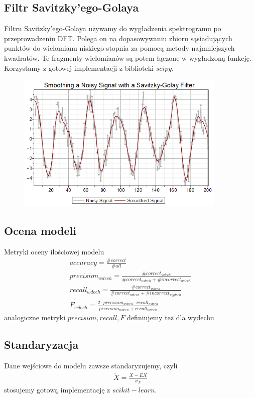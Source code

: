 \documentclass[polish]{article}
\begin{document}
\subsection{Filtr Savitzky'ego-Golaya}
Filtru Savitzky'ego-Golaya używamy do wygładzenia spektrogramu po przeprowadzeniu DFT.  Polega on na dopasowywaniu zbioru sąsiadujących punktów do wielomianu niskiego stopnia za pomocą metody najmniejszych kwadratów.
Te fragmenty wielomianów są potem łączone w wygładzoną funkcję. Korzystamy z gotowej implementacji
z biblioteki $scipy$.
\begin{figure}[H]
	\centering
	\includegraphics[width=10cm]{savitzky_golay_filter}
\end{figure}

\subsection{Ocena modeli}
Metryki oceny ilościowej modelu
\begin{gather*}
	accuracy = \frac{\# correct}{\# all} \\
	precision_{wdech} = \frac{\# correct_{wdech}}{\# correct_{wdech} + \# incorrect_{wdech}} \\
	recall_{wdech} = \frac{\# correct_{wdech}}{\# correct_{wdech} + \# incorrect_{wydech}} \\
	F_{wdech} = \frac{2 \cdot precision_{wdech} \cdot recall_{wdech}}{precision_{wdech} + recall_{wdech}}
\end{gather*}
analogiczne metryki $precision, recall, F$ definiujemy też dla wydechu
\subsection{Standaryzacja}
Dane wejściowe do modelu zawsze standaryzujemy, czyli
\begin{gather*}
	\tilde X = \frac{X - EX}{\sigma_X}
\end{gather*}
stosujemy gotową implementację z $scikit-learn$.
\end{document}

